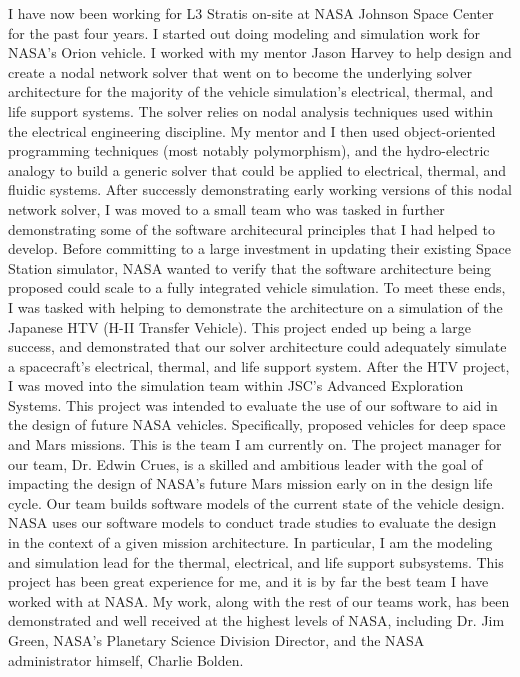 \documentclass{article}
\begin{document}
I have now been working for L3 Stratis on-site at NASA Johnson Space Center for the past four years. 
I started out doing modeling and simulation work for NASA's Orion vehicle. I worked with my mentor
Jason Harvey to help design and create a nodal network solver that went on to become the underlying solver architecture for the majority of the vehicle simulation's electrical, thermal, and life support systems.
The solver relies on nodal analysis techniques used within the electrical engineering discipline. My mentor and I
then used object-oriented programming techniques (most notably polymorphism), and the hydro-electric
analogy to build a generic solver that could be applied to electrical, thermal, and fluidic systems.
After successly demonstrating early working versions of this nodal network solver, I was moved
to a small team who was tasked in further demonstrating some of the software architecural principles
 that I had helped to develop.
Before committing to a large investment in updating their existing Space Station simulator, NASA wanted to verify that the software architecture being proposed could scale to a fully integrated vehicle simulation. To meet these ends, I was tasked with helping to demonstrate the architecture on a simulation of the Japanese
HTV (H-II Transfer Vehicle).
This project ended up being a large success, and demonstrated that our solver architecture
could adequately simulate a spacecraft's electrical, thermal, and life support system. After the 
HTV project, I was moved into the simulation team within JSC's Advanced Exploration Systems.
This project was intended to evaluate the use of our software to aid in the design of future
NASA vehicles. Specifically, proposed vehicles for deep space and Mars missions. This is
the team I am currently on. The project manager for our team, Dr. Edwin Crues, is a skilled and ambitious leader with the goal of impacting the design of NASA's future Mars mission early on in the design life cycle. 
Our team builds software models of the current state of the vehicle design. NASA uses our software
models to conduct trade studies to evaluate the design in the context of a given mission architecture.
In particular, I am the modeling and simulation lead for the thermal, electrical, and life support
subsystems. This project has been great experience for me, and it is by far the best team I have worked
with at NASA. My work, along with the rest of our teams work, has been demonstrated and well received 
at the highest levels of NASA, including Dr. Jim Green, NASA's Planetary Science Division Director, and 
the NASA administrator himself, Charlie Bolden.
\end{document}
